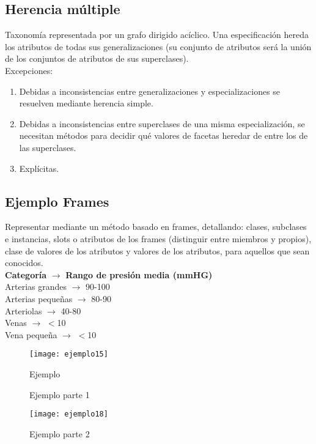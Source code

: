 \documentclass[12pt]{article}
\begin{document}
\subsection{Herencia múltiple}
Taxonomía representada por un grafo dirigido acíclico. Una especificación hereda los atributos de todas sus generalizaciones (su conjunto de atributos será la unión de los conjuntos de atributos de sus superclases).\\
Excepciones:
\begin{enumerate}
\item Debidas a inconsistencias entre generalizaciones y especializaciones se resuelven mediante herencia simple.
\item Debidas a inconsistencias entre superclases de una misma especialización, se necesitan métodos para decidir qué valores de facetas heredar de entre los de las superclases.
\item Explícitas.
\end{enumerate}

\subsection{Ejemplo Frames}
Representar mediante un método basado en frames, detallando: clases, subclases e instancias, slots o atributos de los frames (distinguir entre miembros y propios), clase de valores de los atributos y valores de los atributos, para aquellos que sean conocidos.\\
\textbf{Categoría} $\longrightarrow$ \textbf{Rango de presión media (mmHG)}\\
Arterias grandes $\longrightarrow$ 90-100\\
Arterias pequeñas $\longrightarrow$ 80-90\\
Arteriolas $\longrightarrow$ 40-80\\
Venas $\longrightarrow$ $<$10\\
Vena pequeña $\longrightarrow$ $<$10\\

\begin{figure}[H]
\centering
\texttt{[image: ejemplo15]}
\caption{Ejemplo}
\label{fig:ejemplo15}
\end{figure}

\begin{figure}[H]
 \centering
 \caption{Ejemplo parte 1}
 \label{f:ejemplop1}
\end{figure}

\begin{figure}[H]
\centering
\texttt{[image: ejemplo18]}
\caption{Ejemplo parte 2}
\label{fig:ejemplo18}
\end{figure}
\end{document}
